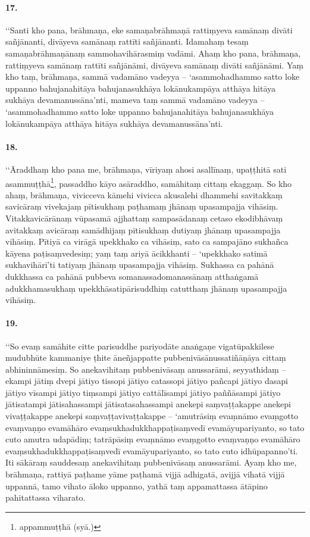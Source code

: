 \paragraph{17.} ‘‘Santi kho pana, brāhmaṇa, eke samaṇabrāhmaṇā rattiṃyeva samānaṃ divāti sañjānanti, divāyeva samānaṃ rattīti sañjānanti. Idamahaṃ tesaṃ samaṇabrāhmaṇānaṃ sammohavihārasmiṃ vadāmi. Ahaṃ kho pana, brāhmaṇa, rattiṃyeva samānaṃ rattīti sañjānāmi, divāyeva samānaṃ divāti sañjānāmi. Yaṃ kho taṃ, brāhmaṇa, sammā vadamāno vadeyya – ‘asammohadhammo satto loke uppanno bahujanahitāya bahujanasukhāya lokānukampāya atthāya hitāya sukhāya devamanussāna’nti, mameva taṃ sammā vadamāno vadeyya – ‘asammohadhammo satto loke uppanno bahujanahitāya bahujanasukhāya lokānukampāya atthāya hitāya sukhāya devamanussāna’nti.

\paragraph{18.} ‘‘Āraddhaṃ kho pana me, brāhmaṇa, vīriyaṃ ahosi asallīnaṃ, upaṭṭhitā sati asammuṭṭhā\footnote{appammuṭṭhā (syā.)}, passaddho kāyo asāraddho, samāhitaṃ cittaṃ ekaggaṃ. So kho ahaṃ, brāhmaṇa, vivicceva kāmehi vivicca akusalehi dhammehi savitakkaṃ savicāraṃ vivekajaṃ pītisukhaṃ paṭhamaṃ jhānaṃ upasampajja vihāsiṃ. Vitakkavicārānaṃ vūpasamā ajjhattaṃ sampasādanaṃ cetaso ekodibhāvaṃ avitakkaṃ avicāraṃ samādhijaṃ pītisukhaṃ dutiyaṃ jhānaṃ upasampajja vihāsiṃ. Pītiyā ca virāgā upekkhako ca vihāsiṃ, sato ca sampajāno sukhañca kāyena paṭisaṃvedesiṃ; yaṃ taṃ ariyā ācikkhanti – ‘upekkhako satimā sukhavihārī’ti tatiyaṃ jhānaṃ upasampajja vihāsiṃ. Sukhassa ca pahānā dukkhassa ca pahānā pubbeva somanassadomanassānaṃ atthaṅgamā adukkhamasukhaṃ upekkhāsatipārisuddhiṃ catutthaṃ jhānaṃ upasampajja vihāsiṃ.

\paragraph{19.} ‘‘So evaṃ samāhite citte parisuddhe pariyodāte anaṅgaṇe vigatūpakkilese mudubhūte kammaniye ṭhite āneñjappatte pubbenivāsānussatiñāṇāya cittaṃ abhininnāmesiṃ. So anekavihitaṃ pubbenivāsaṃ anussarāmi, seyyathidaṃ – ekampi jātiṃ dvepi jātiyo tissopi jātiyo catassopi jātiyo pañcapi jātiyo dasapi jātiyo vīsampi jātiyo tiṃsampi jātiyo cattālīsampi jātiyo paññāsampi jātiyo jātisatampi jātisahassampi jātisatasahassampi anekepi saṃvaṭṭakappe anekepi vivaṭṭakappe anekepi saṃvaṭṭavivaṭṭakappe – ‘amutrāsiṃ evaṃnāmo evaṃgotto evaṃvaṇṇo evamāhāro evaṃsukhadukkhappaṭisaṃvedī evamāyupariyanto, so tato cuto amutra udapādiṃ; tatrāpāsiṃ evaṃnāmo evaṃgotto evaṃvaṇṇo evamāhāro evaṃsukhadukkhappaṭisaṃvedī evamāyupariyanto, so tato cuto idhūpapanno’ti. Iti sākāraṃ sauddesaṃ anekavihitaṃ pubbenivāsaṃ anussarāmi. Ayaṃ kho me, brāhmaṇa, rattiyā paṭhame yāme paṭhamā vijjā adhigatā, avijjā vihatā vijjā uppannā, tamo vihato āloko uppanno, yathā taṃ appamattassa ātāpino pahitattassa viharato.

